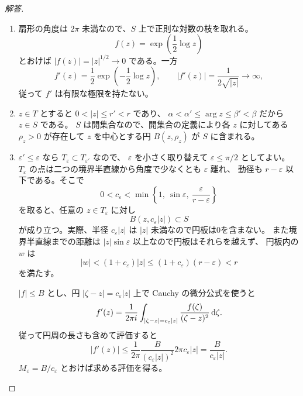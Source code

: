 \begin{proof}[解答]
\begin{enumerate}
\item[(1)] 扇形の角度は $2\pi$ 未満なので、$S$ 上で正則な対数の枝を取れる。
\[
f(z)=\exp\left(\frac12\log z\right)
\]
とおけば $|f(z)|=|z|^{1/2}\to0$ である。一方
\[
f'(z)=\frac12\exp\left(-\frac12\log z\right),\qquad
|f'(z)|=\frac1{2\sqrt{|z|}}\longrightarrow\infty,
\]
従って $f'$ は有限な極限を持たない。

\item[(2)] $z\in T$ とすると $0<|z|\le r'<r$ であり、
$\alpha<\alpha'\le\arg z\le\beta'<\beta$ だから $z\in S$ である。
$S$ は開集合なので、開集合の定義により各 $z$ に対してある $\rho_z>0$ が存在して
$z$ を中心とする円 $B(z,\rho_z)$ が $S$ に含まれる。

\item[(3)] $\varepsilon'\le\varepsilon$ なら $T_\varepsilon\subset T_{\varepsilon'}$ なので、
$\varepsilon$ を小さく取り替えて $\varepsilon\le\pi/2$ としてよい。
$T_\varepsilon$ の点は二つの境界半直線から角度で少なくとも $\varepsilon$ 離れ、
動径も $r-\varepsilon$ 以下である。そこで
\[
0<c_\varepsilon<\min\left\{1,\ \sin\varepsilon,\ \frac{\varepsilon}{r-\varepsilon}\right\}
\]
を取ると、任意の $z\in T_\varepsilon$ に対し
\[
B(z,c_\varepsilon|z|)\subset S
\]
が成り立つ。実際、半径 $c_\varepsilon|z|$ は $|z|$ 未満なので円板は0を含まない。
また境界半直線までの距離は $|z|\sin\varepsilon$ 以上なので円板はそれらを越えず、
円板内の $w$ は
\[
|w|<(1+c_\varepsilon)|z|\le(1+c_\varepsilon)(r-\varepsilon)<r
\]
を満たす。

$|f|\le B$ とし、円 $|\zeta-z|=c_\varepsilon|z|$ 上で Cauchy の微分公式を使うと
\[
f'(z)=\frac1{2\pi i}\int_{|\zeta-z|=c_\varepsilon|z|}
\frac{f(\zeta)}{(\zeta-z)^2}\,\mathrm{d}\zeta.
\]
従って円周の長さも含めて評価すると
\[
|f'(z)|\le
\frac1{2\pi}\frac{B}{(c_\varepsilon|z|)^2}
2\pi c_\varepsilon|z|
=\frac{B}{c_\varepsilon|z|}.
\]
$M_\varepsilon=B/c_\varepsilon$ とおけば求める評価を得る。
\end{enumerate}
\end{proof}

